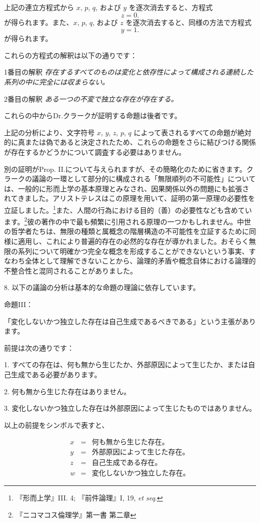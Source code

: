 \documentclass[a4paper,11pt,openany]{ltjsbook}
\begin{document}
上記の連立方程式から $x$, $p$, $q$, および $y$ を逐次消去すると、方程式
\[z = 0.\]
が得られます。また、$x$, $p$, $q$, および $z$ を逐次消去すると、同様の方法で方程式
\[y = 1.\]
が得られます。

これらの方程式の解釈は以下の通りです：

1番目の解釈 \textit{存在するすべてのものは変化と依存性によって構成される連続した系列の中に完全には収まらない。}

2番目の解釈 \textit{ある一つの不変で独立な存在が存在する。}

これらの中からDr.クラークが証明する命題は後者です。

上記の分析により、文字符号 $x$, $y$, $z$, $p$, $q$ によって表されるすべての命題が絶対的に真または偽であると決定されたため、これらの命題をさらに結びつける関係が存在するかどうかについて調査する必要はありません。

別の証明がProp. II.について与えられますが、その簡略化のために省きます。クラークの議論の一環として部分的に構成される「無限順列の不可能性」については、一般的に形而上学の基本原理とみなされ、因果関係以外の問題にも拡張されてきました。アリストテレスはこの原理を用いて、証明の第一原理の必要性を立証しました。\footnote{『形而上学』III. 4; 『前件論理』I, 19, \textit{et seq}.}また、人間の行為における目的（善）の必要性なども含めています。\footnote{『ニコマコス倫理学』第一書 第二章}彼の著作の中で最も頻繁に引用される原理の一つかもしれません。中世の哲学者たちは、無限の種類と属概念の階層構造の不可能性を立証するために同様に適用し、これにより普遍的存在の必然的な存在が導かれました。おそらく無限の系列について明確かつ完全な概念を形成することができないという事実、すなわち全体として理解できないことから、論理的矛盾や概念自体における論理的不整合性と混同されることがありました。

8. 以下の議論の分析は基本的な命題の理論に依存しています。

\textsc{命題III}：

「変化しないかつ独立した存在は自己生成であるべきである」という主張があります。

前提は次の通りです：

1. すべての存在は、何も無から生じたか、外部原因によって生じたか、または自己生成である必要があります。

2. 何も無から生じた存在はありません。

3. 変化しないかつ独立した存在は外部原因によって生じたものではありません。

以上の前提をシンボルで表すと、

\begin{eqnarray*}
x &=& \text{何も無から生じた存在。} \\
y &=& \text{外部原因によって生じた存在。} \\
z &=& \text{自己生成である存在。} \\
w &=& \text{変化しないかつ独立した存在。}
\end{eqnarray*}
\end{document}
